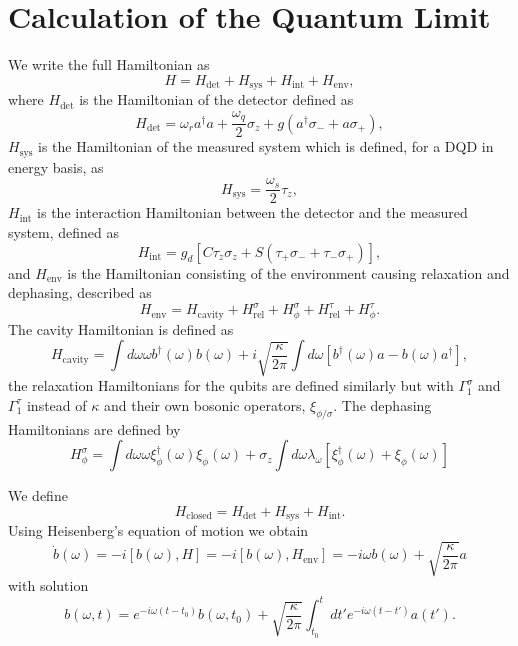 \section{Calculation of the Quantum Limit}
We write the full Hamiltonian as
\begin{equation}
    H = H_\mathrm{det} + H_\mathrm{sys} + H_\mathrm{int} + H_\mathrm{env},
\end{equation}
where $H_\mathrm{det}$ is the Hamiltonian of the detector defined as
\begin{equation}
    H_\mathrm{det} = \omega_r a^\dagger a + \frac{\omega_q}{2} \sigma_z + g (a^\dagger \sigma_- + a \sigma_+),
\end{equation}
$H_\mathrm{sys}$ is the Hamiltonian of the measured system which is defined, for a DQD in energy basis, as
\begin{equation}
    H_\mathrm{sys} = \frac{\omega_s}{2} \tau_z,
\end{equation}
$H_\mathrm{int}$ is the interaction Hamiltonian between the detector and the measured system, defined as
\begin{equation}
    H_\mathrm{int} = g_d [C \tau_z \sigma_z + S(\tau_+ \sigma_- + \tau_- \sigma_+)],
\end{equation}
and $H_\mathrm{env}$ is the Hamiltonian consisting of the environment causing relaxation and dephasing, described as
\begin{equation}
    H_\mathrm{env} = H_\mathrm{cavity} + H_\mathrm{rel}^\sigma + H_\phi^\sigma + H_\mathrm{rel}^\tau + H_\phi^\tau.
\end{equation}
The cavity Hamiltonian is defined as
\begin{equation}
    H_\mathrm{cavity} = \int d\omega \omega b^\dagger(\omega) b(\omega) + i \sqrt{\frac{\kappa}{2\pi}} \int d\omega [b^\dagger(\omega) a - b(\omega) a^\dagger],
\end{equation}
the relaxation Hamiltonians for the qubits are defined similarly but with $\Gamma_1^\sigma$ and $\Gamma_1^\tau$ instead of $\kappa$ and their own bosonic operators, $\xi_{\phi/\sigma}$. The dephasing Hamiltonians are defined by
\begin{equation}
    H_\phi^\sigma = \int d\omega \omega \xi_\phi^\dagger(\omega)\xi_\phi(\omega) + \sigma_z \int d\omega \lambda_\omega [\xi_\phi^\dagger(\omega) + \xi_\phi(\omega)]
\end{equation}

We define 
\begin{equation}
    H_\mathrm{closed} = H_\mathrm{det} + H_\mathrm{sys} + H_\mathrm{int}.
\end{equation}
Using Heisenberg's equation of motion we obtain
\begin{equation}
    \dot{b}(\omega) = -i [b(\omega), H] = -i [b(\omega), H_\mathrm{env}] = -i \omega b(\omega) + \sqrt{\frac{\kappa}{2\pi}} a
\end{equation}
with solution
\begin{equation}
    b(\omega, t) = e^{-i\omega(t-t_0)} b(\omega, t_0) + \sqrt{\frac{\kappa}{2\pi}} \int_{t_0}^{t} dt' e^{-i\omega(t-t')} a(t').
\end{equation}

